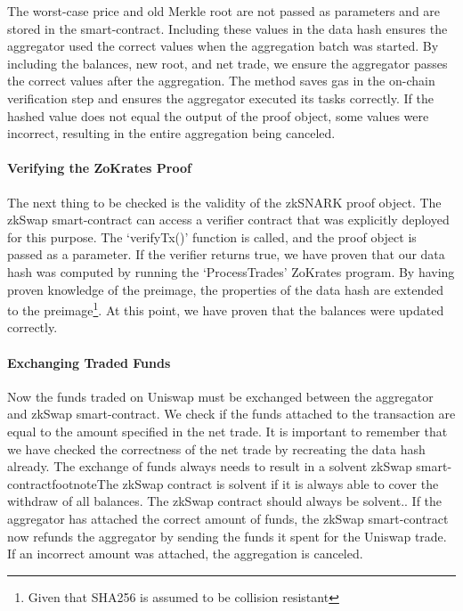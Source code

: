 \documentclass[../../thesis.tex]{subfiles}
\begin{document}
The worst-case price and old Merkle root are not passed as parameters and are stored in the smart-contract. Including these values in the data hash ensures the aggregator used the correct values when the aggregation batch was started. By including the balances, new root, and net trade, we ensure the aggregator passes the correct values after the aggregation. The method saves gas in the on-chain verification step and ensures the aggregator executed its tasks correctly. If the hashed value does not equal the output of the proof object, some values were incorrect, resulting in the entire aggregation being canceled. 

\paragraph{Verifying the ZoKrates Proof}
The next thing to be checked is the validity of the zkSNARK proof object. The zkSwap smart-contract can access a verifier contract that was explicitly deployed for this purpose. The `verifyTx()' function is called, and the proof object is passed as a parameter. If the verifier returns true, we have proven that our data hash was computed by running the `ProcessTrades' ZoKrates program. By having proven knowledge of the preimage, the properties of the data hash are extended to the preimage\footnote{Given that SHA256 is assumed to be collision resistant}. At this point, we have proven that the balances were updated correctly.

\paragraph{Exchanging Traded Funds}
Now the funds traded on Uniswap must be exchanged between the aggregator and zkSwap smart-contract. We check if the funds attached to the transaction are equal to the amount specified in the net trade. It is important to remember that we have checked the correctness of the net trade by recreating the data hash already. The exchange of funds always needs to result in a solvent zkSwap smart-contractfootnote{The zkSwap contract is solvent if it is always able to cover the withdraw of all balances. The zkSwap contract should always be solvent.}. If the aggregator has attached the correct amount of funds, the zkSwap smart-contract now refunds the aggregator by sending the funds it spent for the Uniswap trade. If an incorrect amount was attached, the aggregation is canceled.
\end{document}
